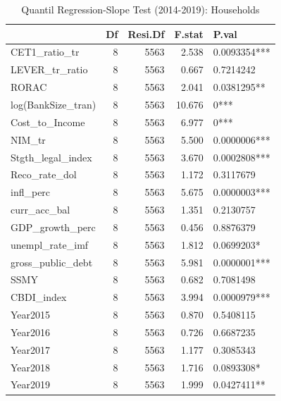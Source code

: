 \begin{table}[ht]
\centering
\caption{Quantil Regression-Slope Test (2014-2019): Households} 
\begingroup\small
\begin{tabular}{lrrrl}
  \toprule
 & Df & Resi.Df & F.stat & P.val \\ 
  \midrule
CET1\_ratio\_tr & 8 & 5563 & 2.538 & 0.0093354*** \\ 
  LEVER\_tr\_ratio & 8 & 5563 & 0.667 & 0.7214242 \\ 
  RORAC & 8 & 5563 & 2.041 & 0.0381295** \\ 
  log(BankSize\_tran) & 8 & 5563 & 10.676 & 0*** \\ 
  Cost\_to\_Income & 8 & 5563 & 6.977 & 0*** \\ 
  NIM\_tr & 8 & 5563 & 5.500 & 0.0000006*** \\ 
  Stgth\_legal\_index & 8 & 5563 & 3.670 & 0.0002808*** \\ 
  Reco\_rate\_dol & 8 & 5563 & 1.172 & 0.3117679 \\ 
  infl\_perc & 8 & 5563 & 5.675 & 0.0000003*** \\ 
  curr\_acc\_bal & 8 & 5563 & 1.351 & 0.2130757 \\ 
  GDP\_growth\_perc & 8 & 5563 & 0.456 & 0.8876379 \\ 
  unempl\_rate\_imf & 8 & 5563 & 1.812 & 0.0699203* \\ 
  gross\_public\_debt & 8 & 5563 & 5.981 & 0.0000001*** \\ 
  SSMY & 8 & 5563 & 0.682 & 0.7081498 \\ 
  CBDI\_index & 8 & 5563 & 3.994 & 0.0000979*** \\ 
  Year2015 & 8 & 5563 & 0.870 & 0.5408115 \\ 
  Year2016 & 8 & 5563 & 0.726 & 0.6687235 \\ 
  Year2017 & 8 & 5563 & 1.177 & 0.3085343 \\ 
  Year2018 & 8 & 5563 & 1.716 & 0.0893308* \\ 
  Year2019 & 8 & 5563 & 1.999 & 0.0427411** \\ 
   \bottomrule
\end{tabular}
\endgroup
\end{table}
